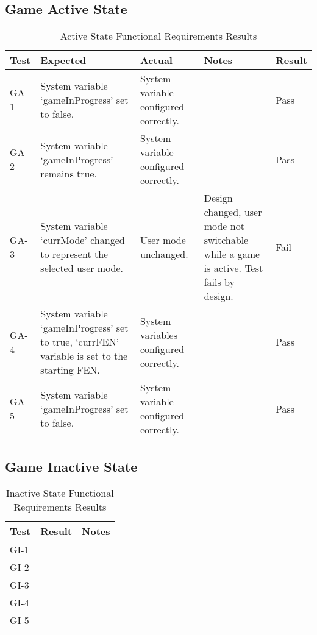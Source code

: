 \documentclass[12pt, titlepage]{article}
\begin{document}
\subsection{Game Active State}

\begin{table}[H]
  \centering
      \setlength{\leftmargini}{0.4cm}
      \begin{tabular}{| >{\centering\arraybackslash}m{1cm} | 
        >{\centering\arraybackslash}m{4cm} | 
        >{\centering\arraybackslash}m{4cm} |
        >{\centering\arraybackslash}m{3cm} |
        >{\centering\arraybackslash}m{1.5cm} |}
      \hline
      \rowcolor[gray]{0.9}
      Test & Expected & Actual & Notes & Result\\
      \hline
      GA-1 & System variable `gameInProgress' set to false. &  System variable configured correctly. &  & Pass \\
      \hline
      GA-2 & System variable `gameInProgress' remains true. &  System variable configured correctly. &  & Pass \\
      \hline
      GA-3 & System variable `currMode' changed to represent the selected user mode. &  User mode unchanged. & Design changed, user mode not switchable while a game is active. Test fails by design. & Fail \\
      \hline
      GA-4 & System variable `gameInProgress' set to true, `currFEN' variable is set to the starting FEN. &  System variables configured correctly. &  & Pass \\
      \hline
      GA-5 & System variable `gameInProgress' set to false. &  System variable configured correctly. &  & Pass \\ 
      \hline
      \end{tabular}
  \caption{Active State Functional Requirements Results}
  \end{table}

\subsection{Game Inactive State}

\begin{table}[H]
\centering
    \setlength{\leftmargini}{0.4cm}
    \begin{tabular}{| >{\centering\arraybackslash}m{3cm} | 
      >{\centering\arraybackslash}m{4cm} | 
      >{\centering\arraybackslash}m{6cm} |}
    \hline
    \rowcolor[gray]{0.9}
    Test & Result & Notes\\
    \hline
    GI-1 &  & \\
    \hline
    GI-2 &  & \\
    \hline
    GI-3 &  & \\
    \hline
    GI-4 &  & \\
    \hline
    GI-5 &  & \\
    \hline
    \end{tabular}
\caption{Inactive State Functional Requirements Results}
\end{table}
\end{document}
